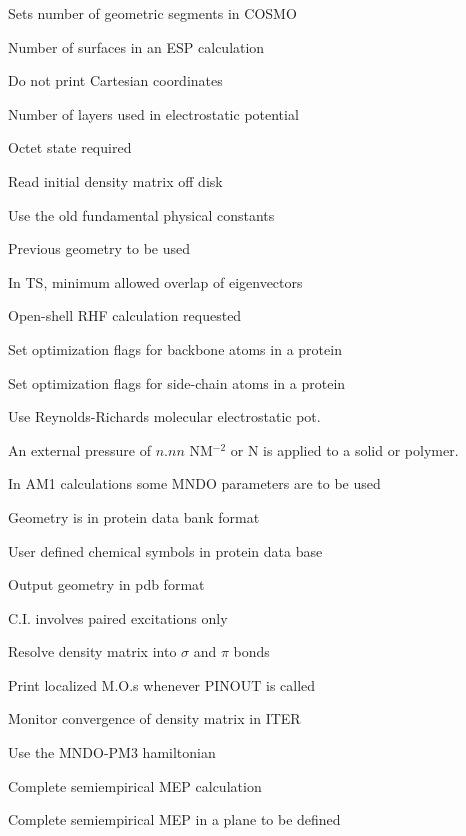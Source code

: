 \begin{description}
\item[] Sets number of geometric segments in COSMO
\item[] Number of surfaces in an ESP calculation
\item[] Do not print Cartesian coordinates
\item[] Number of layers used in electrostatic potential
\item[] Octet state required
\item[] Read initial density matrix off disk
\item[] Use the old fundamental physical constants
\item[] Previous geometry to be used
\item[] In TS, minimum allowed overlap of eigenvectors
\item[] Open-shell RHF calculation requested
\item[] Set optimization flags for backbone atoms in a protein
\item[] Set optimization flags for side-chain atoms in a protein
\item[] Use Reynolds-Richards molecular electrostatic pot.
\item[] An external pressure of $n.nn$ NM$^{-2}$ or N is applied to a solid or polymer.
\item[] In AM1 calculations some MNDO parameters are to be used
\item[] Geometry is in protein data bank format
\item[] User defined chemical symbols in protein data base
\item[] Output geometry in pdb format
\item[] C.I. involves paired excitations only
\item[] Resolve density matrix into $\sigma$ and $\pi$ bonds
\item[] Print localized M.O.s whenever PINOUT is called
\item[] Monitor convergence of density matrix in ITER
\item[] Use the MNDO-PM3 hamiltonian
\item[] Complete semiempirical MEP calculation
\item[] Complete semiempirical MEP in a plane to be defined

\end{description}
